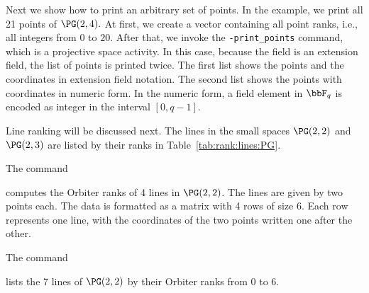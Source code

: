 Next we show how to print an arbitrary set of points. 
In the example, we print all 21 points of $\PG(2,4).$ 
At first, we create a vector containing all point ranks, 
i.e., all integers from $0$ to $20$. 
After that, we invoke the \verb'-print_points' 
command, which is a projective space activity. 
In this case, because the field 
is an extension field, the list of points is printed twice. 
The first list shows the points and the coordinates in extension field notation. 
The second list shows the points with coordinates in numeric form. 
In the numeric form, 
a field element in $\bbF_q$ is encoded as integer in the interval $[0,q-1].$






\bigskip


Line ranking will be discussed next.
The lines in the small spaces $\PG(2,2)$ and $\PG(2,3)$ are listed by their ranks 
in Table~\ref{tab:rank:lines:PG}.



\bigskip

The command 


computes the Orbiter ranks of 4 lines in $\PG(2,2)$. 
The lines are given by two points each. 
The data is formatted as a matrix with 4 rows of size 6.
Each row represents one line, 
with the coordinates of the two points written one after the other.


\bigskip


The command 


lists the 7 lines of $\PG(2,2)$ by their Orbiter 
ranks from $0$ to $6.$


\bigskip






